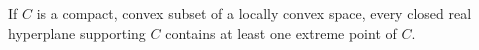 If $C$ is a compact, convex subset of a locally convex space, every closed real hyperplane supporting $C$ contains at least one extreme point of $C$.

